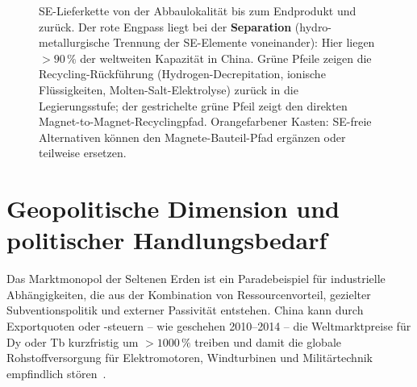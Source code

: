 ﻿\documentclass[12pt, a4paper]{report}
\theoremstyle{definition}
\theoremstyle{remark}
\begin{document}
\begin{figure}
\caption{SE-Lieferkette von der Abbaulokalität bis zum Endprodukt und zurück.
  Der rote Engpass liegt bei der \textbf{Separation} (hydro-metallurgische
  Trennung der SE-Elemente voneinander): Hier liegen $>90\,\%$ der weltweiten
  Kapazität in China. Grüne Pfeile zeigen die Recycling-Rückführung
  (Hydrogen-Decrepitation, ionische Flüssigkeiten, Molten-Salt-Elektrolyse)
  zurück in die Legierungsstufe; der gestrichelte grüne Pfeil zeigt den
  direkten Magnet-to-Magnet-Recyclingpfad. Orangefarbener Kasten: SE-freie
  Alternativen können den Magnete-Bauteil-Pfad ergänzen oder teilweise
  ersetzen.}
\label{fig:re_lieferkette}
\end{figure}

\section{Geopolitische Dimension und politischer Handlungsbedarf}
\label{ssec:re_geopolitik}

Das Marktmonopol der Seltenen Erden ist ein Paradebeispiel für industrielle
Abhängigkeiten, die aus der Kombination von Ressourcenvorteil, gezielter
Subventionspolitik und externer Passivität entstehen. China kann durch
Exportquoten oder -steuern -- wie geschehen 2010--2014 -- die Weltmarktpreise
für Dy oder Tb kurzfristig um $>1000\,\%$ treiben und damit die globale
Rohstoffversorgung für Elektromotoren, Windturbinen und Militärtechnik
empfindlich stören~\cite{massari2013}.
\end{document}
